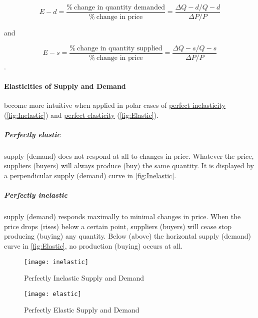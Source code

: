 	\begin{equation} \label{eq:PED}
			E-{d}=\frac{\%\ \mbox{change in quantity demanded}}{\%\ \mbox{change in price}}=\frac{\Delta Q-{d}/{Q-{d}}}{{\Delta P}/{P}}
	\end{equation}

 and

 	\begin{equation} \label{eq:PES}
			E-{s}=\frac{\%\ \mbox{change in quantity supplied}}{\%\ \mbox{change in price}}=\frac{\Delta Q-{s}/{Q-{s}}}{{\Delta P}/{P}}
	\end{equation}.

\paragraph{Elasticities of Supply and Demand} become more intuitive when applied in polar cases of \href{fig:Inelastic}{perfect inelasticity} (\autoref{fig:Inelastic}) and \href{fig:Elastic}{perfect elasticity} (\autoref{fig:Elastic}).


\subparagraph{Perfectly elastic} supply (demand) does not respond at all to changes in price.
Whatever the price, suppliers (buyers) will always produce (buy) the same quantity.
It is displayed by a perpendicular supply (demand) curve in \autoref{fig:Inelastic}.

\subparagraph{Perfectly inelastic} supply (demand) responds maximally to minimal changes in price.
When the price drops (rises) below a certain point, suppliers (buyers) will cease stop producing (buying) any quantity.
Below (above) the horizontal supply (demand) curve in \autoref{fig:Elastic}, no production (buying) occurs at all.

 \begin{figure}[htbp]
	\centering
	\texttt{[image: inelastic]}
	\caption{Perfectly Inelastic Supply and Demand}
	\label{fig:Inelastic}
\end{figure}

 \begin{figure}[htbp]
	\centering
	\texttt{[image: elastic]}
	\caption{Perfectly Elastic Supply and Demand}
	\label{fig:Elastic}
\end{figure}


